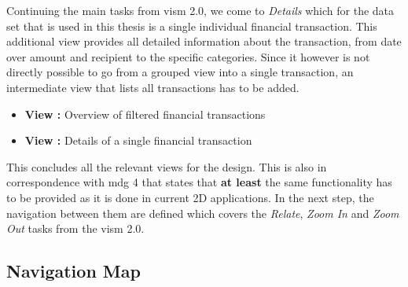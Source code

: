 Continuing the main tasks from \gls{vism} 2.0, we come to \textit{Details} which for the data set that is used in this thesis is a single individual financial transaction. This additional view provides all detailed information about the transaction, from date over amount and recipient to the specific categories. Since it however is not directly possible to go from a grouped view into a single transaction, an intermediate view that lists all transactions has to be added.
\begin{itemize}[noitemsep,nolistsep]
	\item \textbf{View :} Overview of filtered financial transactions
	\item \textbf{View :} Details of a single financial transaction
\end{itemize}


\addtocounter{ViewCounter}{-1}

This concludes all the relevant views for the design. This is also in correspondence with \gls{mdg} 4 that states that \textbf{at least} the same functionality has to be provided as it is done in current 2D applications. \newline
In the next step, the navigation between them are defined which covers the \textit{Relate}, \textit{Zoom In} and \textit{Zoom Out} tasks from the \gls{vism} 2.0.



\subsection{Navigation Map}

